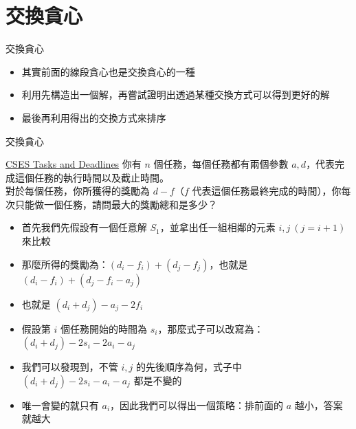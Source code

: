 \documentclass[aspectratio=169]{beamer}
\begin{document}
    \section{交換貪心}

    \begin{frame}{交換貪心}
        \begin{itemize}
            \item 其實前面的線段貪心也是交換貪心的一種
            \item 利用先構造出一個解，再嘗試證明出透過某種交換方式可以得到更好的解
            \item 最後再利用得出的交換方式來排序
        \end{itemize}
    \end{frame}

    \begin{frame}{交換貪心}
        \begin{block}{\href{https://cses.fi/problemset/task/1630/}{CSES Tasks and Deadlines}}
            你有 $n$ 個任務，每個任務都有兩個參數 $a, d$，代表完成這個任務的執行時間以及截止時間。\\
            對於每個任務，你所獲得的獎勵為 $d - f$（$f$ 代表這個任務最終完成的時間），你每次只能做一個任務，請問最大的獎勵總和是多少？
        \end{block}

        \begin{itemize}
            \item<1-> 首先我們先假設有一個任意解 $S_1$，並拿出任一組相鄰的元素 $i, j\ (j = i + 1)$ 來比較
            \item<2-> 那麼所得的獎勵為：$(d_i - f_i) + (d_j - f_j)$，也就是 $(d_i - f_i) + (d_j - f_i - a_j)$
            \item<3-> 也就是 $(d_i + d_j) - a_j - 2f_i$
            \item<4-> 假設第 $i$ 個任務開始的時間為 $s_i$，那麼式子可以改寫為：$(d_i + d_j) - 2s_i - 2a_i - a_j$
            \item<5-> 我們可以發現到，不管 $i, j$ 的先後順序為何，式子中 $(d_i + d_j) - 2s_i - a_i - a_j$ 都是不變的
            \item<6-> 唯一會變的就只有 $a_i$，因此我們可以得出一個策略：排前面的 $a$ 越小，答案就越大
        \end{itemize}
    \end{frame}
\end{document}
